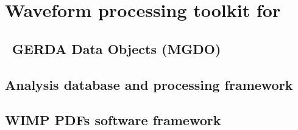 
\chapter{Waveform processing toolkit for \MJ}
\label{app:MGDO}

	\section{\MJ~GERDA Data Objects (MGDO)}
    \label{sec:WaveformProcMGDO}

    \section{Analysis database and processing framework}
    \label{sec:AnalysisDBProcFramework}

    \section{WIMP PDFs software framework}
    \label{sec:WIMPPDFs}
